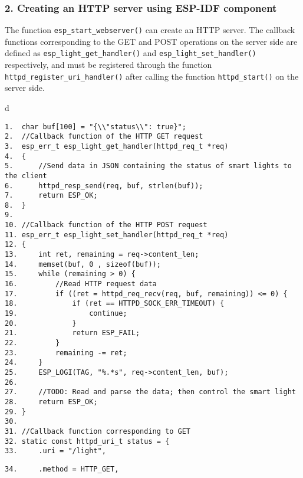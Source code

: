 \documentclass[a4paper,12pt]{book}
\begin{document}
\subsubsection{2. Creating an HTTP server using ESP-IDF component}

The function \verb|esp_start_webserver()| can create an HTTP server. The callback functions corresponding to the GET and POST operations on the server side are defined as \verb|esp_light_get_handler()| and \verb|esp_light_set_handler()| respectively, and must be registered through the function \verb|httpd_register_uri_handler()| after calling the function \verb|httpd_start()| on the server side.

\begin{codebloc}
\begin{tabular}{d}
\vspace{2pt}
\begin{verbatim}
1.  char buf[100] = "{\\"status\\": true}";
2.  //Callback function of the HTTP GET request
3.  esp_err_t esp_light_get_handler(httpd_req_t *req)
4.  {
5.      //Send data in JSON containing the status of smart lights to the client
6.      httpd_resp_send(req, buf, strlen(buf));
7.      return ESP_OK;
8.  }
9.	
10. //Callback function of the HTTP POST request
11. esp_err_t esp_light_set_handler(httpd_req_t *req)
12. {
13.     int ret, remaining = req->content_len;
14.     memset(buf, 0 , sizeof(buf));
15.     while (remaining > 0) {
16.         //Read HTTP request data
17.         if ((ret = httpd_req_recv(req, buf, remaining)) <= 0) {
18.             if (ret == HTTPD_SOCK_ERR_TIMEOUT) {
19.                 continue;
20.             }
21.             return ESP_FAIL;
22.         }
23.         remaining -= ret;
24.     }
25.     ESP_LOGI(TAG, "%.*s", req->content_len, buf);
26.	
27.     //TODO: Read and parse the data; then control the smart light
28.     return ESP_OK;
29. }
30.	
31. //Callback function corresponding to GET
32. static const httpd_uri_t status = {
33.     .uri = "/light",
\end{verbatim}
\verb|34.     .method = HTTP_GET,|
\end{tabular}
\end{codebloc}
\end{document}
